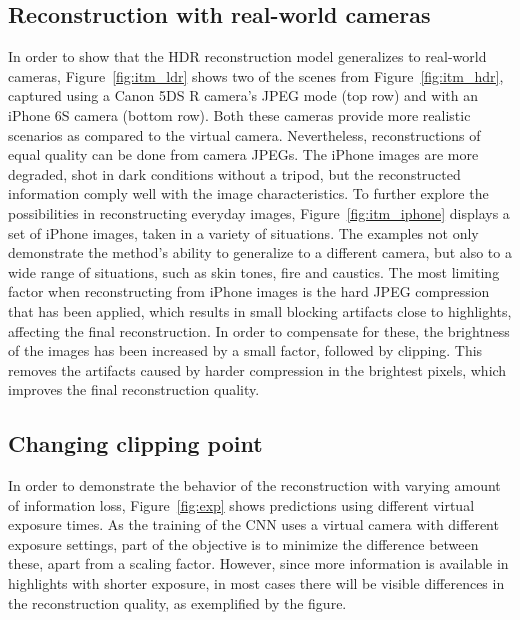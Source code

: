 \documentclass[acmtog]{acmart}
\newcommand{\figref}[1]{Figure~\ref{fig:#1}}
\newcommand\customsection[1]{\subsection{#1}}
\begin{document}
\customsection{Reconstruction with real-world cameras}
In order to show that the HDR reconstruction model generalizes to real-world cameras, \figref{itm_ldr} shows two of the scenes from \figref{itm_hdr}, captured using a Canon 5DS R camera's JPEG mode (top row) and with an iPhone 6S camera (bottom row). Both these cameras provide more realistic scenarios as compared to the virtual camera.
Nevertheless, reconstructions of equal quality can be done from camera JPEGs. The iPhone images are more degraded, shot in dark conditions without a tripod, but the reconstructed information comply well with the image characteristics. To further explore the possibilities in reconstructing everyday images, \figref{itm_iphone} displays a set of iPhone images, taken in a variety of situations. The examples not only demonstrate the method's ability to generalize to a different camera, but also to a wide range of situations, such as skin tones, fire and caustics. The most limiting factor when reconstructing from iPhone images is the hard JPEG compression that has been applied, which results in small blocking artifacts close to highlights, affecting the final reconstruction. In order to compensate for these, the brightness of the images has been increased by a small factor, followed by clipping. This removes the artifacts caused by harder compression in the brightest pixels, which improves the final reconstruction quality.

\customsection{Changing clipping point}
In order to demonstrate the behavior of the reconstruction with varying amount of information loss, \figref{exp} shows predictions using different virtual exposure times. As the training of the CNN uses a virtual camera with different exposure settings, part of the objective is to minimize the difference between these, apart from a scaling factor. However, since more information is available in highlights with shorter exposure, in most cases there will be visible differences in the reconstruction quality, as exemplified by the figure.
\end{document}
